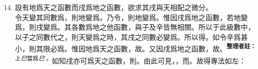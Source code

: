 \begin{enumerate} [label={第\chinese*款},nolistsep]
	\setcounter{enumi}{13}
	\item 設有地爲天之函數而戌爲地之函數，欲求其戌與天相配之微分。\\
	令天變其同數爲\CJKmove，則地變爲\CJKmove。乃令\CJKmove，則地變爲\CJKmove。惟因戌爲地之函數，若地變爲\CJKmove，則戌變爲\CJKmove。其\CJKmove 各數爲地之他函數，與子及辛皆無相關。所以于此級數中，以子之同數\CJKmove 代之，則天變爲\CJKmove 之時，其戌之同數必變爲\CJKmove。所以得\CJKmove。如令辛爲甚小，則其限必爲\CJKmove。惟因地爲天之函數，故\CJKmove。又因戌爲地之函數，故\CJKmove。\textsuperscript{\textbf{整理者註：}上\textit{巳}當爲\textit{巳}'。}如知戌亦可爲天之函數，則\CJKmove。由此可見，\CJKmove，而\CJKmove。故得專法如左：\\

\end{enumerate}
